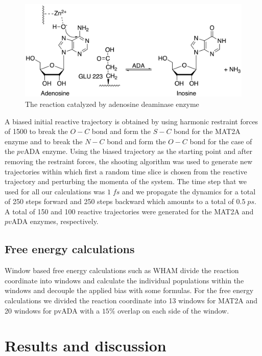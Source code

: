 \documentclass[journal=jpcbfk,manuscript=article,layout=traditional]{achemso}
\begin{document}
\begin{figure}
\includegraphics[scale=0.6]{figures/ada-new.png}
\caption{The reaction catalyzed by adenosine deaminase enzyme}
\label{fig:ada-reaction}
\end{figure}

A biased initial reactive trajectory is obtained by using harmonic restraint forces 
of 1500 to break the $O-C$ bond and form the $S-C$ bond for the MAT2A enzyme and 
to break the $N-C$ bond and form the $O-C$ bond for the case of the $pv$ADA enzyme. 
Using the biased trajectory as the starting point and after removing the restraint 
forces, the shooting algorithm was used to generate
new trajectories within which first a random time slice is chosen from the reactive 
trajectory and perturbing the momenta of the system. 
The time step that we used for all our calculations was $1\;fs$ and we propagate the 
dynamics for a total of 250 steps forward and 250 steps backward which amounts to a 
total of $0.5\;ps$. 
A total of 150 and 100 reactive trajectories were generated for the MAT2A and $pv$ADA
enzymes, respectively. 

\subsection{Free energy calculations}
Window based free energy calculations such as WHAM divide the reaction coordinate
into windows and calculate the individual populations within the windows and 
decouple the applied bias with some formulas. 
For the free energy calculations we divided the reaction coordinate into 13 windows for 
MAT2A and 20 windows for pvADA with a $15\%$ overlap on each side of the window. 

\section{Results and discussion}
\end{document}
